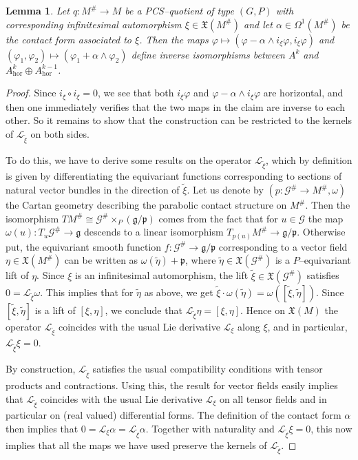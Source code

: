 \documentclass[12pt,a4paper]{amsart}
\def\frak{\mathfrak}
\def\Cal{\mathcal}
\let\phi\varphi
\newcommand{\x}{\times}
\renewcommand{\o}{\circ}
\newcommand{\al}{\alpha}
\newcommand{\om}{\omega}
\newcommand{\ph}{\phi}
\newcommand{\Om}{\Omega}
\newcommand{\hor}{\text{hor}}
\newcounter{theorem}
\numberwithin{theorem}{section}
\newtheorem{lemma}[theorem]{Lemma}
\theoremstyle{definition}
\theoremstyle{remark}
\begin{document}
\begin{lemma}\label{lem4.2}
  Let $q:M^\#\to M$ be a PCS--quotient of type $(G,P)$ with
  corresponding infinitesimal automorphism $\xi\in\frak X(M^\#)$ and let
  $\al\in\Om^1(M^\#)$ be the contact form associated to $\xi$. Then
  the maps $\ph\mapsto (\ph-\al\wedge i_\xi\ph,i_\xi\ph)$ and
  $(\ph_1,\ph_2)\mapsto (\ph_1+\al\wedge\ph_2)$ define inverse
  isomorphisms between $A^k$ and $A^k_\hor\oplus A^{k-1}_\hor$.
\end{lemma}
\begin{proof}
  Since $i_\xi\o i_\xi=0$, we see that both $i_\xi\ph$ and
  $\ph-\al\wedge i_\xi\ph$ are horizontal, and then one immediately
  verifies that the two maps in the claim are inverse to each
  other. So it remains to show that the construction can be restricted
  to the kernels of $\Cal L_{\tilde\xi}$ on both sides.

  To do this, we have to derive some results on the operator $\Cal
  L_{\tilde\xi}$, which by definition is given by differentiating the
  equivariant functions corresponding to sections of natural vector
  bundles in the direction of $\tilde\xi$. Let us denote by $(p:\Cal
  G^\#\to M^\#,\om)$ the Cartan geometry describing the parabolic
  contact structure on $M^\#$. Then the isomorphism $TM^\#\cong\Cal
  G^\#\x_P(\frak g/\frak p)$ comes from the fact that for $u\in\Cal G$
  the map $\om(u):T_u\Cal G^\#\to\frak g$ descends to a linear
  isomorphism $T_{p(u)}M^\#\to\frak g/\frak p$. Otherwise put, the
  equivariant smooth function $f:\Cal G^\#\to\frak g/\frak p$
  corresponding to a vector field $\eta\in\frak X(M^\#)$ can be
  written as $\om(\tilde\eta)+\frak p$, where $\tilde\eta\in\frak
  X(\Cal G^\#)$ is a $P$--equivariant lift of $\eta$. Since $\xi$ is
  an infinitesimal automorphism, the lift $\tilde\xi\in\frak X(\Cal
  G^\#)$ satisfies $0=\Cal L_{\tilde\xi}\om$. This implies that for
  $\tilde\eta$ as above, we get
  $\tilde\xi\cdot\om(\tilde\eta)=\om([\tilde\xi,\tilde\eta])$. Since
  $[\tilde\xi,\tilde\eta]$ is a lift of $[\xi,\eta]$, we conclude that
  $\Cal L_{\tilde\xi}\eta=[\xi,\eta]$. Hence on $\frak X(M)$ the
  operator $\Cal L_{\tilde\xi}$ coincides with the usual Lie
  derivative $\Cal L_\xi$ along $\xi$, and in particular, $\Cal
  L_{\tilde\xi}\xi=0$.

  By construction, $\Cal L_{\tilde\xi}$ satisfies the usual
  compatibility conditions with tensor products and
  contractions. Using this, the result for vector fields easily
  implies that $\Cal L_{\tilde\xi}$ coincides with the usual Lie
  derivative $\Cal L_\xi$ on all tensor fields and in particular on
  (real valued) differential forms. The definition of the contact form
  $\al$ then implies that $0=\Cal L_\xi\al=\Cal
  L_{\tilde\xi}\al$. Together with naturality and $\Cal
  L_{\tilde\xi}\xi=0$, this now implies that all the maps we have used
  preserve the kernels of $\Cal L_{\tilde\xi}$.
\end{proof}
\end{document}
